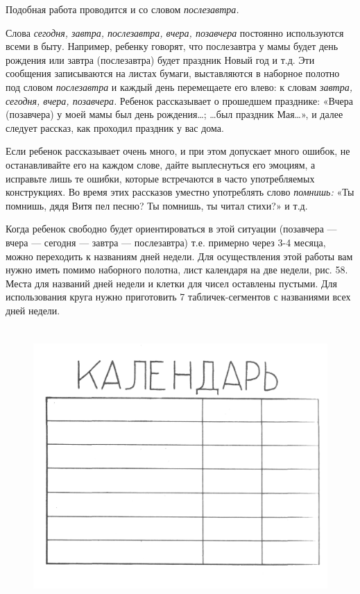 \documentclass[a5paper]{book}
\renewcommand{\emph}[1]{\textit{#1}}
\begin{document}
Подобная работа проводится и со словом \emph{послезавтра.}

Слова \emph{сегодня, завтра, послезавтра, вчера, позавчера} постоянно
используются всеми в быту. Например, ребенку говорят, что послезавтра у
мамы будет день рождения или завтра (послезавтра) будет праздник Новый
год и т.д. Эти сообщения записываются на листах бумаги, выставляются в
наборное полотно под словом \emph{послезавтра} и каждый день перемещаете
его влево: к словам \emph{завтра, сегодня, вчера, позавчера.} Ребенок
рассказывает о прошедшем празднике: «Вчера (позавчера) у моей мамы был
день рождения\ldots; \ldots был праздник Мая\ldots», и далее следует
рассказ, как проходил праздник у вас дома.

Если ребенок рассказывает очень много, и при этом допускает много
ошибок, не останавливайте его на каждом слове, дайте выплеснуться его
эмоциям, а исправьте лишь те ошибки, которые встречаются в часто
употребляемых конструкциях. Во время этих рассказов уместно употреблять
слово \emph{помнишь:} «Ты помнишь, дядя Витя пел песню? Ты помнишь, ты
читал стихи?» и т.д.

Когда ребенок свободно будет ориентироваться в этой ситуации (позавчера
--- вчера --- сегодня --- завтра --- послезавтра) т.е. примерно через
3-4 месяца, можно переходить к названиям дней недели. Для осуществления
этой работы вам нужно иметь помимо наборного полотна, лист календаря на
две недели, рис. 58. Места для названий дней недели и клетки для чисел
оставлены пустыми. Для использования круга нужно приготовить 7
табличек-сегментов с названиями всех дней недели.

\begin{figure}
\centering
\includegraphics[width=5.01319in,height=4.16667in]{media/media/image55.jpg}
\end{figure}
\end{document}
